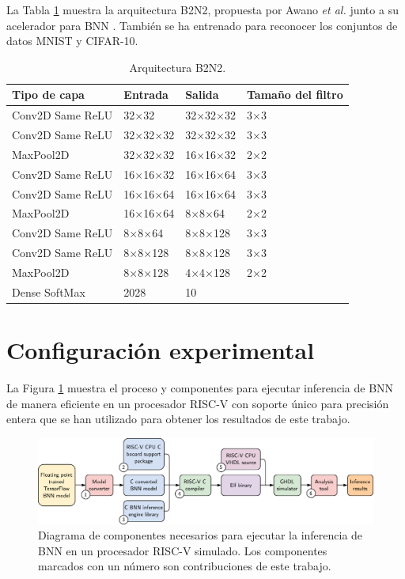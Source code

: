 La Tabla \ref{tab:b2n2_model} muestra la arquitectura B2N2, propuesta por Awano \emph{et al.} junto a su acelerador para BNN \cite{bnn_clt_approx}. También se ha entrenado para reconocer los conjuntos de datos MNIST y CIFAR-10.

\begin{table}[h]
	\centering
	\caption{Arquitectura B2N2.}
	\label{tab:b2n2_model}
	\begin{tabular}{llll}
	\hline
	\textbf{Tipo de capa} & \textbf{Entrada} & \textbf{Salida} & \textbf{Tamaño del filtro}\\ \hline
	Conv2D Same ReLU& 32$\times$32 & 32$\times$32$\times$32 & 3$\times$3 \\
	Conv2D Same  ReLU& 32$\times$32$\times$32 & 32$\times$32$\times$32 & 3$\times$3 \\
	MaxPool2D & 32$\times$32$\times$32 & 16$\times$16$\times$32 & 2$\times$2 \\
	Conv2D Same  ReLU& 16$\times$16$\times$32 & 16$\times$16$\times$64 & 3$\times$3 \\
	Conv2D Same  ReLU& 16$\times$16$\times$64 & 16$\times$16$\times$64 & 3$\times$3 \\
	MaxPool2D & 16$\times$16$\times$64 & 8$\times$8$\times$64 & 2$\times$2 \\
	Conv2D Same  ReLU& 8$\times$8$\times$64 & 8$\times$8$\times$128 & 3$\times$3 \\
	Conv2D Same  ReLU& 8$\times$8$\times$128 & 8$\times$8$\times$128 & 3$\times$3 \\
	MaxPool2D & 8$\times$8$\times$128 & 4$\times$4$\times$128 & 2$\times$2 \\
	Dense SoftMax& 2028 & 10 & \\ \hline
	\end{tabular}
\end{table}

\section{Configuración experimental}

La Figura \ref{fig:experiment_pipeline} muestra el proceso y componentes para ejecutar inferencia de BNN de manera eficiente en un procesador RISC-V con soporte único para precisión entera que se han utilizado para obtener los resultados de este trabajo.

\begin{figure}[h]
	\centering
	\includegraphics[width=\textwidth]{root/Imagenes/metodologia/experiment_pipeline.pdf}
	\caption{Diagrama de componentes necesarios para ejecutar la inferencia de BNN en un procesador RISC-V simulado. Los componentes marcados con un número son contribuciones de este trabajo.}
	\label{fig:experiment_pipeline}
\end{figure}

